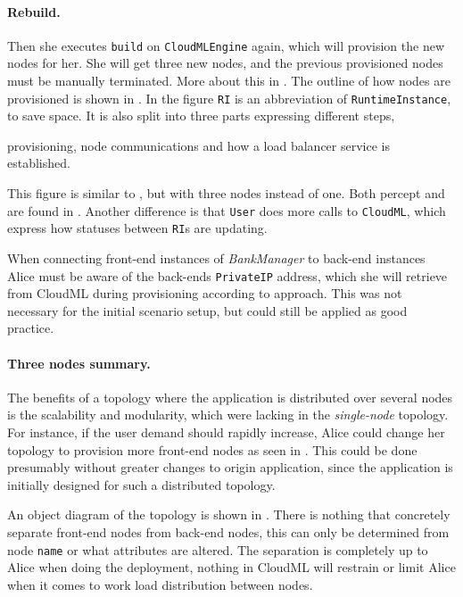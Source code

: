 \paragraph{Rebuild.}


Then she executes \texttt{build} on \texttt{CloudMLEngine} again,
which will provision the new nodes for her.
She will get three new nodes, and the previous provisioned nodes must be manually terminated.
More about this in .
The outline of how nodes are provisioned is shown in .
In the figure \texttt{RI} is an abbreviation of \texttt{RuntimeInstance}, to save space.
It is also split into three parts expressing different steps, 
\begin{ii}
  \iitem provisioning, 
  \iitem node communications and
  \iitem how a load balancer service is established.
\end{ii}
This figure is similar to , but with three nodes instead of one.
Both percept  and  are found in .
Another difference is that \texttt{User} does more calls to \texttt{CloudML},
which express how statuses between \texttt{RI}s are updating.

When connecting front-end instances of \emph{BankManager} to back-end instances Alice must 
be aware of the back-ends \texttt{PrivateIP} address, which she will retrieve from CloudML
during provisioning according to  approach.
This was not necessary for the initial scenario setup, but could still be applied
as good practice.

\paragraph{Three nodes summary.}


The benefits of a topology where the application is distributed over several nodes 
is the scalability and modularity, which were lacking in the \emph{single-node} topology.
For instance, if the user demand should rapidly increase, Alice could change her topology to
provision more front-end nodes as seen in .
This could be done presumably without greater changes to origin application,
since the application is initially designed for such a distributed topology.

An object diagram of the topology is shown in .
There is nothing that concretely separate front-end nodes from back-end nodes,
this can only be determined from node \texttt{name} or what attributes are altered.
The separation is completely up to Alice when doing the deployment,
\ie nothing in CloudML will restrain or limit Alice 
when it comes to work load distribution between nodes.

